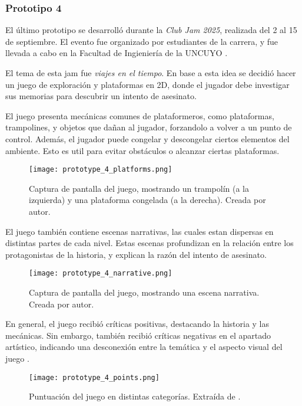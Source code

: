 \subsubsection{Prototipo 4}
El último prototipo se desarrolló durante la \textit{Club Jam 2025}, realizada del 2 al 15 de septiembre. El evento fue organizado por estudiantes de la carrera, y fue llevada a cabo en la Facultad de Ingieniería de la UNCUYO \cite{ClubJam2025}.
\par El tema de esta jam fue \textit{viajes en el tiempo}. En base a esta idea se decidió hacer un juego de exploración y plataformas en 2D, donde el jugador debe investigar sus memorias para descubrir un intento de asesinato.
\par El juego presenta mecánicas comunes de plataformeros, como plataformas, trampolines, y objetos que dañan al jugador, forzandolo a volver a un punto de control. Además, el jugador puede congelar y descongelar ciertos elementos del ambiente. Esto es util para evitar obstáculos o alcanzar ciertas plataformas.
\begin{figure}[H]
  \centering
  \texttt{[image: prototype\_4\_platforms.png]}
  \caption{Captura de pantalla del juego, mostrando un trampolín (a la izquierda) y una plataforma congelada (a la derecha). Creada por autor.}
  \label{fig:x prototipo 4 plataformas}
\end{figure}
\par El juego también contiene escenas narrativas, las cuales estan dispersas en distintas partes de cada nivel. Estas escenas profundizan en la relación entre los protagonistas de la historia, y explican la razón del intento de asesinato.
\begin{figure}[H]
  \centering
  \texttt{[image: prototype\_4\_narrative.png]}
  \caption{Captura de pantalla del juego, mostrando una escena narrativa. Creada por autor.}
  \label{fig:x prototipo 4 narrativa}
\end{figure}
\bigbreak
\par En general, el juego recibió críticas positivas, destacando la historia y las mecánicas. Sin embargo, también recibió críticas negativas en el apartado artístico, indicando una desconexión entre la temática y el aspecto visual del juego \cite{VueloKaleidoskopioFranco}.
\begin{figure}[H]
  \centering
  \texttt{[image: prototype\_4\_points.png]}
  \caption{Puntuación del juego en distintas categorías. Extraída de \cite{VueloKaleidoskopioFranco}.}
  \label{fig:x prototipo 4 puntuacion}
\end{figure}
